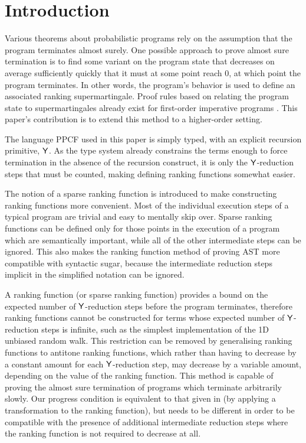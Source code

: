 
\section{Introduction}
\label{sec:intro}

Various theorems about probabilistic programs rely on the assumption that the program terminates almost surely. One possible approach to prove almost sure termination is to find some variant on the program state that decreases on average sufficiently quickly that it must at some point reach 0, at which point the program terminates. In other words, the program's behavior is used to define an associated ranking supermartingale. Proof rules based on relating the program state to supermartingales already exist for first-order imperative programs \cite{DBLP:journals/pacmpl/McIverMKK18}. This paper's contribution is to extend this method to a higher-order setting.

The language PPCF used in this paper is simply typed, with an explicit recursion primitive, $\mathsf{Y}$. As the type system already constrains the terms enough to force termination in the absence of the recursion construct, it is only the $\mathsf{Y}$-reduction steps that must be counted, making defining ranking functions somewhat easier.

The notion of a sparse ranking function is introduced to make constructing ranking functions more convenient. Most of the individual execution steps of a typical program are trivial and easy to mentally skip over. Sparse ranking functions can be defined only for those points in the execution of a program which are semantically important, while all of the other intermediate steps can be ignored. This also makes the ranking function method of proving AST more compatible with syntactic sugar, because the intermediate reduction steps implicit in the simplified notation can be ignored.

A ranking function (or sparse ranking function) provides a bound on the expected number of $\mathsf{Y}$-reduction steps before the program terminates, therefore ranking functions cannot be constructed for terms whose expected number of $\mathsf{Y}$-reduction steps is infinite, such as the simplest implementation of the 1D unbiased random walk. This restriction can be removed by generalising ranking functions to antitone ranking functions, which rather than having to decrease by a constant amount for each $\mathsf{Y}$-reduction step, may decrease by a variable amount, depending on the value of the ranking function. This method is capable of proving the almost sure termination of programs which terminate arbitrarily slowly. Our progress condition is equivalent to that given in \cite{DBLP:journals/pacmpl/McIverMKK18} (by applying a transformation to the ranking function), but needs to be different in order to be compatible with the presence of additional intermediate reduction steps where the ranking function is not required to decrease at all.

